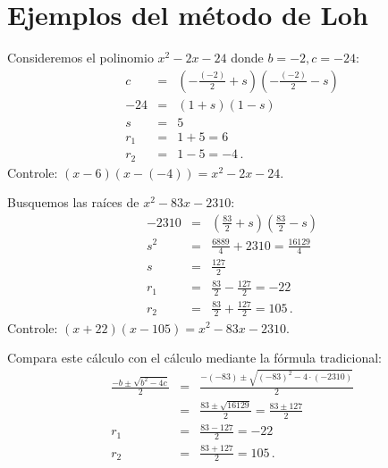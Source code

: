 \section{Ejemplos del método de Loh}\label{s.examples}

\begin{example}
Consideremos el polinomio $x^2-2x-24$ donde $b=-2,c=-24$:
\begin{eqnarray*}
c&=&\left(-\frac{(-2)}{2} +s\right)\left(-\frac{(-2)}{2} -s\right)\\
-24&=&(1 +s)(1 -s)\\
s&=&5\\
r_1&=&1+5=6\\
r_2&=&1-5=-4\,.
\end{eqnarray*}
Controle: $(x-6)(x-(-4))= x^2-2x-24$.
\end{example}

\begin{example}
Busquemos las raíces de $x^2-83x-2310$:
\begin{eqnarray*}
-2310&=&\left(\frac{83}{2}+s\right)\left(\frac{83}{2} -s\right)\\
s^2&=&\frac{6889}{4}+2310=\frac{16129}{4}\\
s&=&\frac{127}{2}\\
r_1&=&\frac{83}{2}-\frac{127}{2}=-22\\
r_2&=&\frac{83}{2}+\frac{127}{2}=105\,.
\end{eqnarray*}
Controle: $(x+22)(x-105)= x^2-83x-2310$.

Compara este cálculo con el cálculo mediante la fórmula tradicional:
\begin{eqnarray*}
\frac{-b\pm\sqrt{b^2-4c}}{2}&=&\frac{-(-83)\pm\sqrt{(-83)^2-4\cdot (-2310)}}{2}\\
&=& \frac{83\pm\sqrt{16129}}{2} = \frac{83\pm 127}{2}\\
r_1&=&\frac{83-127}{2}=-22\\
r_2&=&\frac{83+127}{2}=105\,.
\end{eqnarray*}
\end{example}

